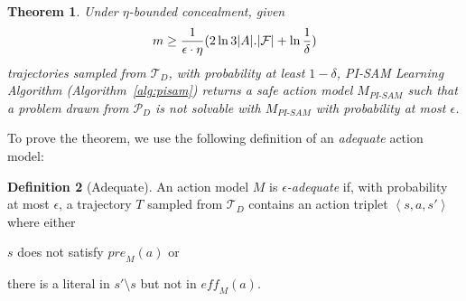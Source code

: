 \documentclass{article}
\theoremstyle{plain}
\newtheorem{theorem}{Theorem}[section]
\theoremstyle{definition}
\newtheorem{definition}[theorem]{Definition}
\theoremstyle{remark}
\theoremstyle{observation}
\newcommand{\tuple}[1]{\ensuremath{\left \langle #1 \right \rangle }}
\newcommand{\pre}{\textit{pre}}
\newcommand{\eff}{\textit{eff}}
\newcommand{\pisam}{\textit{PI-SAM}\xspace}
\begin{document}
\setcounter{theorem}{1}
\begin{theorem}\label{complexity-pisam-thm-appendix}
Under $\eta$-bounded concealment, given 
\begin{equation*}
    \small
m \geq \frac{1}{\epsilon \cdot\eta} (2\ln 3 |A|.{|\mathcal{F}|} + \ln \frac{1}{\delta})
\end{equation*}
trajectories sampled from $\mathcal{T}_D$, with probability at least $1-\delta $, 
PI-SAM Learning Algorithm (Algorithm~\ref{alg:pisam}) returns a safe action model $M_\pisam$ such that a problem drawn from $\mathcal{P}_D$ is not solvable with $M_\pisam$ with probability at most $\epsilon$.
\end{theorem}

To prove the theorem, we use the following definition of an {\em adequate} action model:
\begin{definition}[Adequate]
An action model $M$ is {\em $\epsilon$-adequate} if, with probability at most $\epsilon$, a trajectory $T$ sampled from $\mathcal{T}_D$ contains an action triplet $\tuple{s,a,s'}$ where either
\begin{compactenum}
\item $s$ does not satisfy $\pre_M(a)$ or
\item there is a literal in $s'\setminus s$ but not in $\eff_M(a)$.
\end{compactenum}
\end{definition}
\end{document}
